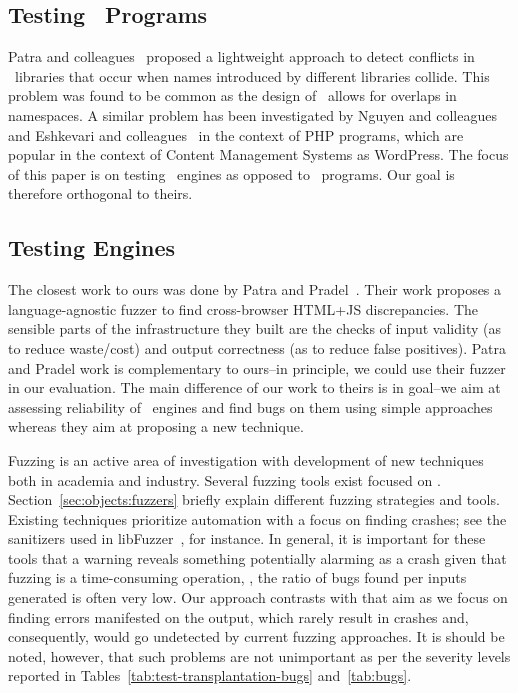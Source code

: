 \documentclass[sigconf,review, anonymous]{acmart}
\begin{document}
\subsection{Testing \js\ Programs}
Patra and colleagues~\cite{Patra:2018:CFU:3180155.3180184} proposed a
lightweight approach to detect conflicts in \js\ libraries that occur
when names introduced by different libraries collide. This problem was
found to be common as the design of \js\ allows for overlaps in
namespaces. A similar problem has been investigated by Nguyen and
colleagues~\cite{nguyen-etal-icse2014} and Eshkevari and
colleagues~\cite{eshkevari-etal-icpc2014} in the context of PHP
programs, which are popular in the context of Content Management
Systems as WordPress. The focus of this paper is on testing
\js\ engines as opposed to \js\ programs. Our goal is therefore
orthogonal to theirs.

\subsection{Testing \js{} Engines}
\label{sec:testing-js-engines}
The closest work to ours was done by Patra and
Pradel~\cite{patra2016learning}. Their work proposes a
language-agnostic fuzzer to find cross-browser HTML+JS
discrepancies. The sensible parts of the infrastructure they
built are the checks of input validity (as to reduce waste/cost) and
output correctness (as to reduce false positives). Patra and Pradel
work is complementary to ours--in principle, we could use their fuzzer
in our evaluation. The main difference of our work to theirs is in
goal--we aim at assessing reliability of \js\ engines and find bugs on
them using simple approaches whereas they aim at proposing a new
technique.

Fuzzing is an active area of investigation with development of new
techniques both in academia and industry. Several fuzzing tools exist
focused on \js. Section~\ref{sec:objects:fuzzers} briefly explain
different fuzzing strategies and tools. Existing techniques prioritize
automation with a focus on finding crashes; see the sanitizers used in
libFuzzer~\cite{libfuzzer-tutorial}, for instance. In general, it is
important for these tools that a warning reveals something potentially
alarming as a crash given that fuzzing is a time-consuming operation,
\ie{}, the ratio of bugs found per inputs generated is often very low.
Our approach contrasts with that aim as we focus on finding errors
manifested on the output, which rarely result in crashes and,
consequently, would go undetected by current fuzzing approaches. It is
should be noted, however, that such problems are not unimportant as
per the severity levels reported in
Tables~\ref{tab:test-transplantation-bugs} and~\ref{tab:bugs}.
\end{document}
